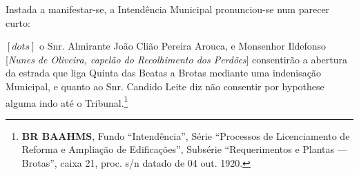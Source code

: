 Instada a manifestar-se, a Intendência Municipal pronunciou-se num parecer curto:

\begin{citacao}
\([dots]\) o Snr. Almirante João Clião Pereira Arouca, e Monsenhor Ildefonso [\textit{Nunes de Oliveira, capelão do Recolhimento dos Perdões}] consentirão a abertura da estrada que liga Quinta das Beatas a Brotas mediante uma indenisação Municipal, e quanto ao Snr. Candido Leite diz não consentir por hypothese alguma indo até o Tribunal.\footnote{\textbf{BR BAAHMS}, Fundo ``Intendência'', Série ``Processos de Licenciamento de Reforma e Ampliação de Edificações'', Subsérie ``Requerimentos e Plantas --- Brotas'', caixa 21, proc. s/n datado de 04 out. 1920.}
\end{citacao}

